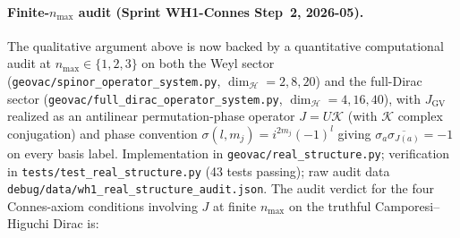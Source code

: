 \documentclass[11pt]{article}
\begin{document}
\paragraph{Finite-$n_{\max}$ audit (Sprint WH1-Connes Step~2,
2026-05).}  The qualitative argument above is now backed by a
quantitative computational audit at $n_{\max} \in \{1, 2, 3\}$ on
both the Weyl sector
(\texttt{geovac/spinor\_operator\_system.py}, $\dim_{\mathcal{H}} = 2,
8, 20$) and the full-Dirac sector
(\texttt{geovac/full\_dirac\_operator\_system.py},
$\dim_{\mathcal{H}} = 4, 16, 40$), with
$J_{\mathrm{GV}}$ realized as an antilinear permutation-phase operator
$J = U \mathcal{K}$ (with $\mathcal{K}$ complex conjugation) and phase
convention $\sigma(l, m_j) = i^{2 m_j} (-1)^l$ giving
$\sigma_a \overline{\sigma_{J(a)}} = -1$ on every basis label.
Implementation in \texttt{geovac/real\_structure.py};
verification in \texttt{tests/test\_real\_structure.py}
(43 tests passing); raw audit data
\texttt{debug/data/wh1\_real\_structure\_audit.json}.
The audit verdict for the four Connes-axiom conditions involving $J$
at finite $n_{\max}$ on the truthful Camporesi--Higuchi Dirac is:
\end{document}
